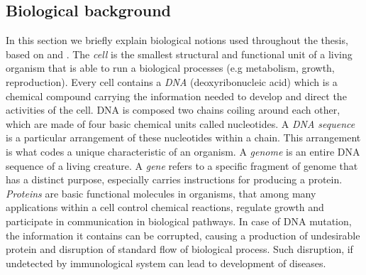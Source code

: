 \documentclass[12pt, wide]{mwart}
\begin{document}
\subsection{Biological background} \label{section:bio}
In this section we briefly explain biological notions used throughout the thesis, based on \cite{NHGRI} and \cite{GeneExpr}. The \textit{cell} is the smallest structural and functional unit of a living organism that is able to run a biological processes (e.g metabolism, growth, reproduction). Every cell contains a \textit{DNA} (deoxyribonucleic acid) which is a chemical compound carrying the information needed to develop and direct the activities of the cell. DNA is composed two chains coiling around each other, which are made of four basic chemical units called nucleotides. A \textit{DNA sequence} is a particular arrangement of these nucleotides within a chain. This arrangement is what codes a unique characteristic of an organism. A \textit{genome} is an entire DNA sequence of a living creature. A \textit{gene} refers to a specific fragment of genome that has a distinct purpose, especially carries instructions for producing a protein. \textit{Proteins} are basic functional molecules in organisms, that among many applications within a cell control chemical reactions, regulate growth and participate in communication in biological pathways. In case of DNA mutation, the information it contains can be corrupted, causing a production of undesirable protein and disruption of standard flow of biological process. Such disruption, if undetected by immunological system can lead to development of diseases.
\end{document}

